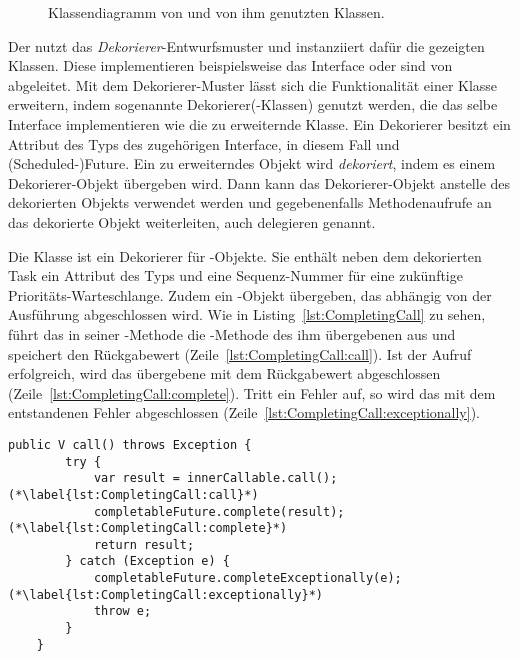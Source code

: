\begin{figure}[htbp]
	\centering
	
	\caption{Klassendiagramm von \classCompletableFutureWrapper{} und von ihm genutzten Klassen.}\label{fig:wrapper}
\end{figure}

Der \classCompletableFutureWrapper{} nutzt das \emph{Dekorierer}-Entwurfsmuster  und instanziiert dafür die gezeigten Klassen. Diese implementieren beispielsweise das Interface \classCallable{} oder sind von \classCompletableFuture{} abgeleitet. Mit dem Dekorierer-Muster lässt sich die Funktionalität einer Klasse erweitern, indem sogenannte Dekorierer(-Klassen) genutzt werden, die das selbe Interface implementieren wie die zu erweiternde Klasse. Ein Dekorierer besitzt ein Attribut des Typs des zugehörigen Interface, in diesem Fall \classCallable{} und \class(Scheduled-)Future{}. Ein zu erweiterndes Objekt wird \emph{dekoriert}, indem es einem Dekorierer-Objekt übergeben wird. Dann kann das Dekorierer-Objekt anstelle des dekorierten Objekts verwendet werden und gegebenenfalls Methodenaufrufe an das dekorierte Objekt weiterleiten, auch delegieren genannt.


Die Klasse \classCompletingCallable{} ist ein Dekorierer für \classCallable{}-Objekte. Sie enthält neben dem dekorierten Task  ein Attribut des Typs \classTaskPriority{} und eine Sequenz-Nummer für eine zukünftige Prioritäts-Warteschlange. Zudem ein \classCompletableFuture{}-Objekt übergeben, das abhängig von der Ausführung abgeschlossen wird. Wie in Listing~\ref{lst:CompletingCall} zu sehen, führt das \classCompletingCallable{} in seiner -Methode die -Methode des ihm übergebenen \classCallable{}  aus und speichert den Rückgabewert (Zeile~\ref{lst:CompletingCall:call}). Ist der Aufruf erfolgreich, wird das übergebene \classCompletableFuture{} mit dem Rückgabewert abgeschlossen (Zeile~\ref{lst:CompletingCall:complete}). Tritt ein Fehler auf, so wird das  \classCompletableFuture{} mit dem entstandenen Fehler abgeschlossen (Zeile~\ref{lst:CompletingCall:exceptionally}).

\begin{lstlisting}[caption={\tcode{call()}-Methode von \classCompletingCallable{}. Das enthaltene \classCallable{} wird ausgeführt und dann das \classCompletableFuture{} abgeschlossen.}, label={lst:CompletingCall},float={thbp}]
	public V call() throws Exception {
		try {
			var result = innerCallable.call(); (*\label{lst:CompletingCall:call}*)
			completableFuture.complete(result); (*\label{lst:CompletingCall:complete}*)
			return result;
		} catch (Exception e) {
			completableFuture.completeExceptionally(e); (*\label{lst:CompletingCall:exceptionally}*)
			throw e;
		}
	}
\end{lstlisting}


